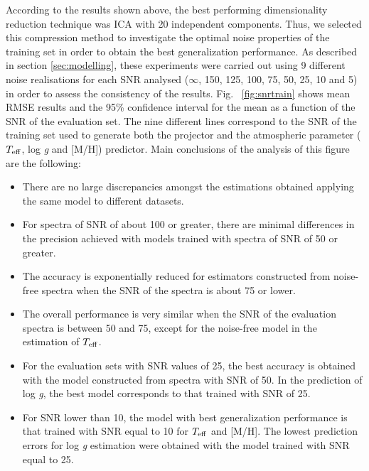 \documentclass[a4paper,fleqn,usenatbib]{mnras}
\begin{document}
{{{%


According to the results shown above, the best performing
dimensionality reduction technique was ICA with 20 independent
components. Thus, we selected this compression method to investigate
the optimal noise properties of the training set in order to obtain
the best generalization performance.  As described in section
\ref{sec:modelling}, these experiments were carried out using 9
different noise realisations for each SNR analysed ($\infty$, 150,
125, 100, 75, 50, 25, 10 and 5) in order to assess the consistency of
the results.  Fig.~ \ref{fig:snrtrain} shows mean RMSE results and the
95\% confidence interval for the mean as a function of the SNR of the
evaluation set. The nine different lines correspond to the SNR of the
training set used to generate both the projector and the atmospheric
parameter ($T_{\rm eff}$, log \textit{g} and [M/H]) predictor.  Main
conclusions of the analysis of this figure are the following:

\begin{itemize}
\item There are no large discrepancies amongst the estimations 
	obtained applying the same model to different datasets.
\item For spectra of SNR of about 100 or greater, there are minimal
  differences in the precision achieved with models trained with
  spectra of SNR of 50 or greater.
\item The accuracy is exponentially reduced for estimators
  constructed from noise-free spectra when the SNR of the spectra is
  about 75 or lower.
\item The overall performance is very similar when the SNR of the
  evaluation spectra is between 50 and 75, except for the noise-free
  model in the estimation of $T_{\rm eff}$. 
\item For the evaluation sets with SNR values of 25, the best accuracy
  is obtained with the model constructed from spectra with SNR of 50. 
  In the prediction of log \textit{g}, the best model corresponds to 
  that trained with SNR of 25.
\item For SNR lower than 10, the model with best generalization
  performance is that trained with SNR equal to 10 for $T_{\rm eff}$ 
  and [M/H]. The lowest prediction errors for log \textit{g} estimation 
  were obtained with the model trained with SNR equal to 25.
\end{itemize}

}}}
\end{document}
